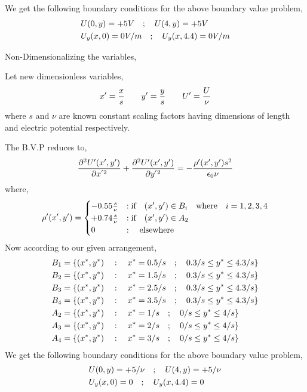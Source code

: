We get the following boundary conditions for the above boundary value problem,
\begin{align}
    & U(0,y) = +5 V \hspace{0.35cm}; \hspace{0.35cm} U(4,y) = +5 V \\ 
    & U_y(x,0) = 0V/m \hspace{0.35cm}; \hspace{0.35cm} U_y(x,4.4) = 0V/m 
\end{align}

Non-Dimensionalizing the variables,

Let new dimensionless variables,
\begin{align}
    x' = \frac{x}{s} \gs \gs y' = \frac{y}{s} \gs \gs U' = \frac{U}{\nu}
\end{align}
where $s$ and $\nu$ are known constant scaling factors having dimensions of length and electric potential respectively.

The B.V.P reduces to,
\begin{equation}
    \frac{\partial^2U'(x',y') }{\partial x^{'2}} + \frac{\partial^2U'(x',y') }{\partial y^{'2}}= -\frac{\rho'(x',y') s^2}{\epsilon_0 \nu} \\
\end{equation}
where,
\begin{equation}
\rho'(x',y') =  \begin{cases}
    -0.55\frac{s}{\nu}  & :\text{if} \hspace{0.35cm} (x',y') \in B_i \hspace{0.35cm} \text{where} \hspace{0.35cm} i = 1,2,3,4 \\
    +0.74\frac{s}{\nu} & :\text{if} \hspace{0.35cm} (x',y') \in A_2  \\
    0  & : \hspace{0.35cm} \text{elsewhere} \\
\end{cases}
\end{equation}
Now according to our given arrangement,
\begin{align}
    B_1 &= \{ (x^*,y^*) \hspace{0.35cm} : \hspace{0.35cm} x^*= 0.5/s \hspace{0.35cm};\hspace{0.35cm} 0.3/s \leq y^* \leq 4.3/s \} \\
    B_2 &= \{ (x^*,y^*) \hspace{0.35cm} : \hspace{0.35cm} x^*= 1.5/s \hspace{0.35cm};\hspace{0.35cm} 0.3/s \leq y^* \leq 4.3/s \} \\
    B_3 &= \{ (x^*,y^*) \hspace{0.35cm} : \hspace{0.35cm} x^*= 2.5/s \hspace{0.35cm};\hspace{0.35cm} 0.3/s \leq y^* \leq 4.3/s \} \\
    B_4 &= \{ (x^*,y^*) \hspace{0.35cm} : \hspace{0.35cm} x^*= 3.5/s \hspace{0.35cm};\hspace{0.35cm} 0.3/s \leq y^* \leq 4.3/s \} \\
    A_2 &= \{ (x^*,y^*) \hspace{0.35cm} : \hspace{0.35cm} x^*= 1/s \hspace{0.35cm};\hspace{0.35cm} 0/s \leq y^* \leq 4/s \} \\
    A_3 &= \{ (x^*,y^*) \hspace{0.35cm} : \hspace{0.35cm} x^*= 2/s \hspace{0.35cm};\hspace{0.35cm} 0/s \leq y^* \leq 4/s \} \\
    A_4 &= \{ (x^*,y^*) \hspace{0.35cm} : \hspace{0.35cm} x^*= 3/s \hspace{0.35cm};\hspace{0.35cm} 0/s \leq y^* \leq 4/s \} 
\end{align}
We get the following boundary conditions for the above boundary value problem,
\begin{align}
    & U(0,y) = +5/\nu \hspace{0.35cm}; \hspace{0.35cm} U(4,y) = +5/\nu \\ 
    & U_y(x,0) = 0 \hspace{0.35cm}; \hspace{0.35cm} U_y(x,4.4) = 0 
\end{align}